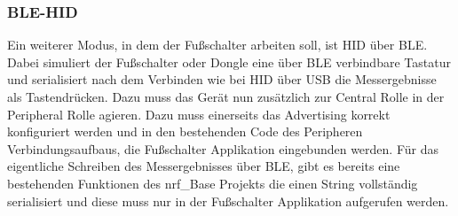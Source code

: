 \subsubsection{BLE-HID}
Ein weiterer Modus, in dem der Fußschalter arbeiten soll, ist \ac{HID} über \ac{BLE}. Dabei simuliert der Fußschalter oder Dongle eine über \ac{BLE} verbindbare Tastatur und serialisiert nach dem Verbinden wie bei \ac{HID} über \ac{USB} die Messergebnisse als Tastendrücken. Dazu muss das Gerät nun zusätzlich zur Central Rolle in der Peripheral Rolle agieren. Dazu muss einerseits das Advertising korrekt konfiguriert werden und in den bestehenden Code des Peripheren Verbindungsaufbaus, die Fußschalter Applikation eingebunden werden. Für das eigentliche Schreiben des Messergebnisses über \ac{BLE}, gibt es bereits eine bestehenden Funktionen des nrf\_Base Projekts die einen String vollständig serialisiert und diese muss nur in der Fußschalter Applikation aufgerufen werden.\\
